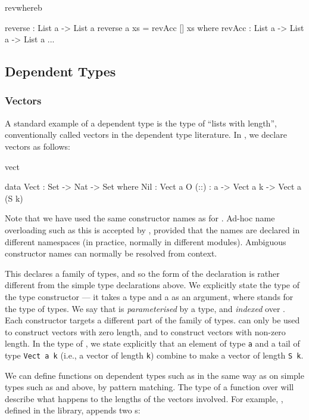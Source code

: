 \begin{SaveVerbatim}{revwhereb}

reverse : List a -> List a
reverse {a} xs = revAcc [] xs where
  revAcc : List a -> List a -> List a
  ...

\end{SaveVerbatim}

\subsection{Dependent Types}

\subsubsection{Vectors}

A standard example of a dependent type is the type of ``lists with length'',
conventionally called vectors in the dependent type literature. In \Idris{},
we declare vectors as follows:

\begin{SaveVerbatim}{vect}

data Vect : Set -> Nat -> Set where
   Nil  : Vect a O
   (::) : a -> Vect a k -> Vect a (S k)

\end{SaveVerbatim}

\noindent
Note that we have used the same constructor names as for . Ad-hoc
name overloading such as this is accepted by \Idris{}, provided that the names
are declared in different namespaces (in practice, normally in different modules).
Ambiguous constructor names can normally be resolved from context.

This declares a family of types, and so the form of the declaration is rather
different from the simple type declarations above. We explicitly state the type
of the type constructor  --- it takes a type and a  as an
argument, where  stands for the type of types. We say that 
is \emph{parameterised} by a type, and \emph{indexed} over . Each
constructor targets a different part of the family of types.  can only
be used to construct vectors with zero length, and \tDC{::} to construct
vectors with non-zero length. In the type of \tDC{::}, we state explicitly that an element
of type \texttt{a} and a tail of type \texttt{Vect a k} (i.e., a vector of length \texttt{k})
combine to make a vector of length \texttt{S k}.

We can define functions on dependent types such as  in the same way
as on simple types such as  and  above, by pattern matching.
The type of a function over  will describe what happens to the
lengths of the vectors involved. For example, \tFN{++}, defined in the
library, appends two s:

